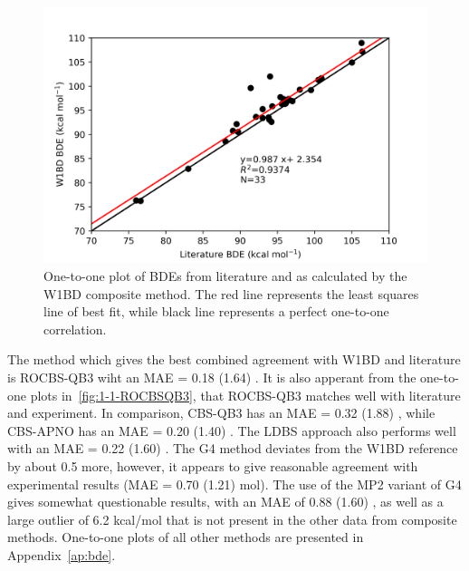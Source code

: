 \begin{figure}[H]
  \centering
  \includegraphics[width=\textwidth]{figures/lit-w1bd}
  \caption[One-to-one plot of BDEs from literature and as calculated by the W1BD composite method.]{One-to-one plot of BDEs from literature\protect\cite{Luo2002} and as calculated by the W1BD composite method. The red line represents the least squares line of best fit, while black line represents a perfect one-to-one correlation.}
  \label{fig:1-1-W1BD}
\end{figure}

The method which gives the best combined agreement with W1BD and literature is ROCBS-QB3 wiht an MAE = 0.18 (1.64) \kcalmol. It is also apperant from the one-to-one plots in~\ref{fig:1-1-ROCBSQB3}, that ROCBS-QB3 matches well with literature and experiment. In comparison, CBS-QB3 has an MAE = 0.32 (1.88) \kcalmol, while CBS-APNO has an MAE = 0.20 (1.40) \kcalmol. The LDBS approach also performs well with an MAE = 0.22 (1.60) \kcalmol. The G4 method deviates from the W1BD reference by about 0.5 \kcalmol more, however, it appears to give reasonable agreement with experimental results (MAE = 0.70 (1.21) mol). The use of the MP2 variant of G4 gives somewhat questionable results, with an MAE of 0.88 (1.60) \kcalmol, as well as a large outlier of 6.2 kcal/mol that is not present in the other data from composite methods. One-to-one plots of all other methods are presented in Appendix~\ref{ap:bde}.

